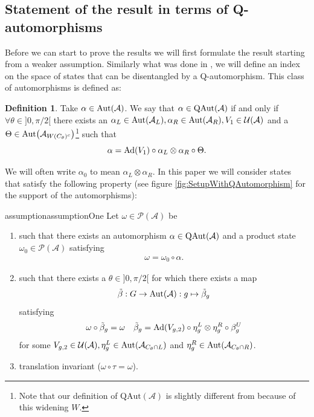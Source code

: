 \documentclass[12pt,a4paper,twoside]{article}
\let\originalleft\left
\let\originalright\right
\renewcommand{\left}{\mathopen{}\mathclose\bgroup\originalleft}
\renewcommand{\right}{\aftergroup\egroup\originalright}
\newcommand{\UU}{\mathcal U}
\newcommand{\PP}{\mathcal P}
\renewcommand{\AA}{\mathcal A}
\newcommand{\Ad}[1]{\textrm{Ad}\left(#1\right)}
\newcommand{\Aut}[1]{\textrm{Aut}\left(#1\right)}
\newcommand{\QAut}[1]{\textrm{QAut}\left(#1\right)}
\theoremstyle{definition}
\newtheorem{definition}[theorem]{Definition}
\numberwithin{equation}{section}
\begin{document}
\subsection{Statement of the result in terms of Q-automorphisms}\label{sec:Results_2}

Before we can start to prove the results we will first formulate the result starting from a weaker assumption. Similarly what was done in \cite{ogata2021h3gmathbb}, we will define an index on the space of states that can be disentangled by a Q-automorphism. This class of automorphisms is defined as:
\begin{definition}
	Take $\alpha\in\Aut{\AA}$. We say that $\alpha\in\QAut{\AA}$ if and only if $\forall\theta\in]0,\pi/2[$ there exists an $\alpha_L\in\Aut{\AA_L},\alpha_R\in\Aut{\AA_R},V_1\in\UU(\AA)$ and a $\Theta\in\Aut{\AA_{W(C_\theta)^c}}$\footnote{Note that our definition of $\textrm{QAut}(\AA)$ is slightly different from \cite{ogata2021h3gmathbb} because of this widening $W$.} such that
	\begin{equation}
		\alpha=\Ad{V_1}\circ\alpha_L\otimes\alpha_R\circ\Theta.
	\end{equation}
\end{definition}
We will often write $\alpha_0$ to mean $\alpha_L\otimes\alpha_R$. In this paper we will consider states that satisfy the following property (see figure \ref{fig:SetupWithQAutomorphism} for the support of the automorphisms):
\begin{restatable}{assumption}{assumptionOne}\label{assumption}
	Let $\omega\in\PP(\AA)$ be
	\begin{enumerate}
		\item such that there exists an automorphism $\alpha\in\QAut{\AA}$ and a product state $\omega_0\in\PP(\AA)$ satisfying
		\begin{align}
			\omega=\omega_0\circ\alpha.
		\end{align}
		\item such that there exists a $\theta\in]0,\pi/2[$ for which there exists a map
		\begin{equation}
			\tilde\beta:G\rightarrow\Aut{\AA}:g\mapsto\tilde\beta_g
		\end{equation}
		satisfying
		\begin{align}
			\omega\circ\tilde\beta_g&=\omega&\tilde\beta_g=\Ad{V_{g,2}}\circ\eta^L_g\otimes\eta^R_g\circ\beta^U_g
		\end{align}
		for some $V_{g,2}\in\UU(\AA),\eta^L_g\in\Aut{\AA_{C_\theta\cap L}}$ and $\eta^R_g\in\Aut{\AA_{C_\theta\cap R}}$.
		\item translation invariant ($\omega\circ\tau=\omega$).
	\end{enumerate}
\end{restatable}
\end{document}
